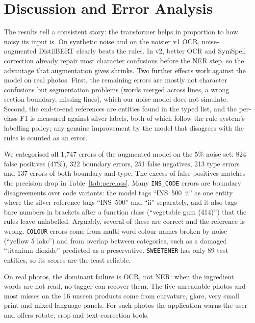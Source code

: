 \documentclass[conference]{IEEEtran}
\begin{document}
\section{Discussion and Error Analysis}
\label{sec:discussion}

The results tell a consistent story: the transformer helps in proportion to how noisy its input is. On synthetic noise and on the noisier v1 OCR, noise-augmented DistilBERT clearly beats the rules. In v2, better OCR and SymSpell correction already repair most character confusions before the NER step, so the advantage that augmentation gives shrinks. Two further effects work against the model on real photos. First, the remaining errors are mostly not character confusions but segmentation problems (words merged across lines, a wrong section boundary, missing lines), which our noise model does not simulate. Second, the end-to-end references are entities found in the typed list, and the per-class F1 is measured against silver labels, both of which follow the rule system's labelling policy; any genuine improvement by the model that disagrees with the rules is counted as an error.

We categorised all 1,747 errors of the augmented model on the 5\% noise set: 824 false positives (47\%), 322 boundary errors, 251 false negatives, 213 type errors and 137 errors of both boundary and type. The excess of false positives matches the precision drop in Table~\ref{tab:perclass}. Many \texttt{INS\_CODE} errors are boundary disagreements over code variants: the model tags ``INS~500~ii'' as one entity where the silver reference tags ``INS~500'' and ``ii'' separately, and it also tags bare numbers in brackets after a function class (``vegetable gum (414)'') that the rules leave unlabelled. Arguably, several of these are correct and the reference is wrong. \texttt{COLOUR} errors come from multi-word colour names broken by noise (``yeIlow 5 lakc'') and from overlap between categories, such as a damaged ``titanium dioxide'' predicted as a preservative. \texttt{SWEETENER} has only 89 test entities, so its scores are the least reliable.

On real photos, the dominant failure is OCR, not NER: when the ingredient words are not read, no tagger can recover them. The five unreadable photos and most misses on the 16 unseen products come from curvature, glare, very small print and mixed-language panels. For such photos the application warns the user and offers rotate, crop and text-correction tools.
\end{document}
